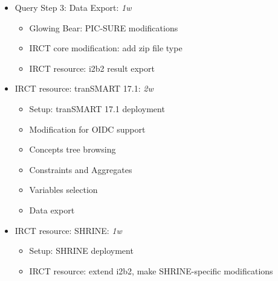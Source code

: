 \begin{itemize}
    \item Query Step 3: Data Export: \emph{1w}
    \begin{itemize}
        \item Glowing Bear: PIC-SURE modifications
        \item IRCT core modification: add zip file type
        \item IRCT resource: i2b2 result export
    \end{itemize}

    \item IRCT resource: tranSMART 17.1: \emph{2w}
    \begin{itemize}
        \item Setup: tranSMART 17.1 deployment
        \item Modification for OIDC support
        \item Concepts tree browsing
        \item Constraints and Aggregates
        \item Variables selection
        \item Data export
    \end{itemize}
    
    \item IRCT resource: SHRINE: \emph{1w}
    \begin{itemize}
        \item Setup: SHRINE deployment
        \item IRCT resource: extend i2b2, make SHRINE-specific modifications
    \end{itemize}
\end{itemize}

